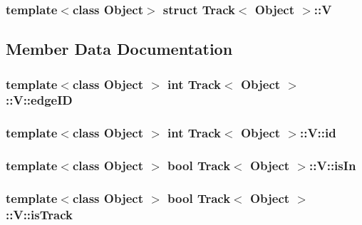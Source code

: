 \subsubsection*{template$<$class Object$>$ struct Track$<$ Object $>$\-::\-V}



\subsection{\-Member \-Data \-Documentation}
\hypertarget{struct_track_1_1_v_aec3bb0bf355e284c09b7060fd29159d8}{
\subsubsection[{edge\-I\-D}]{\setlength{\rightskip}{0pt plus 5cm}template$<$class Object $>$ int {\bf \-Track}$<$ \-Object $>$\-::{\bf \-V\-::edge\-I\-D}}}\label{struct_track_1_1_v_aec3bb0bf355e284c09b7060fd29159d8}
\hypertarget{struct_track_1_1_v_a269ff7fe62ae123da1435a1b967c6b28}{
\subsubsection[{id}]{\setlength{\rightskip}{0pt plus 5cm}template$<$class Object $>$ int {\bf \-Track}$<$ \-Object $>$\-::{\bf \-V\-::id}}}\label{struct_track_1_1_v_a269ff7fe62ae123da1435a1b967c6b28}
\hypertarget{struct_track_1_1_v_a7de2b199ddc675def7f13b250ec68e85}{
\subsubsection[{is\-In}]{\setlength{\rightskip}{0pt plus 5cm}template$<$class Object $>$ bool {\bf \-Track}$<$ \-Object $>$\-::{\bf \-V\-::is\-In}}}\label{struct_track_1_1_v_a7de2b199ddc675def7f13b250ec68e85}
\hypertarget{struct_track_1_1_v_a3a8fa6dcc220698f6e1c53e77edb6375}{
\subsubsection[{is\-Track}]{\setlength{\rightskip}{0pt plus 5cm}template$<$class Object $>$ bool {\bf \-Track}$<$ \-Object $>$\-::{\bf \-V\-::is\-Track}}}\label{struct_track_1_1_v_a3a8fa6dcc220698f6e1c53e77edb6375}
